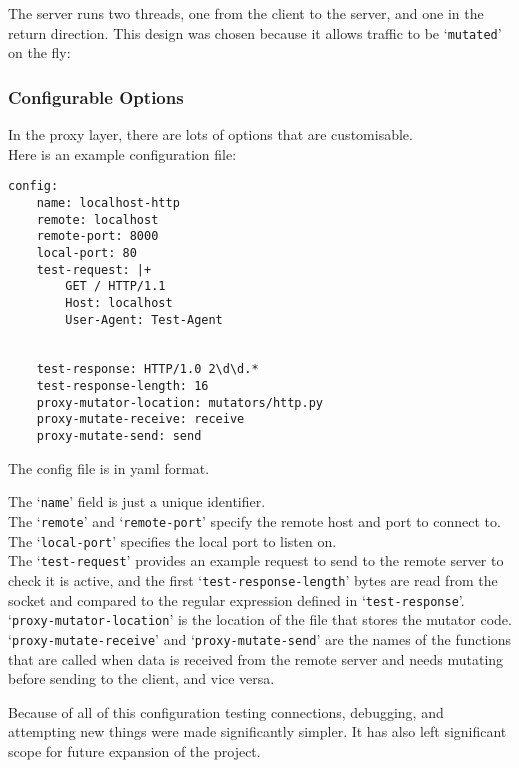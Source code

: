 The server runs two threads, one from the client to the server, and one in the return direction.\newpage
This design was chosen because it allows traffic to be `\texttt{mutated}' on the fly:
\begin{center}
\end{center}

\subsubsection{Configurable Options}
In the proxy layer, there are lots of options that are customisable.\\
Here is an example configuration file:
\begin{verbatim}
config:
    name: localhost-http
    remote: localhost
    remote-port: 8000
    local-port: 80
    test-request: |+
        GET / HTTP/1.1
        Host: localhost
        User-Agent: Test-Agent


    test-response: HTTP/1.0 2\d\d.*
    test-response-length: 16
    proxy-mutator-location: mutators/http.py
    proxy-mutate-receive: receive
    proxy-mutate-send: send
\end{verbatim}
The config file is in yaml format.\par
The `\texttt{name}' field is just a unique identifier.\\
The `\texttt{remote}' and `\texttt{remote-port}' specify the remote host and port to connect to.\\
The `\texttt{local-port}' specifies the local port to listen on.\\
The `\texttt{test-request}' provides an example request to send to the remote server to check it is active, and the first `\texttt{test-response-length}' bytes are read from the socket and compared to the regular expression defined in `\texttt{test-response}'.\\
`\texttt{proxy-mutator-location}' is the location of the file that stores the mutator code.
`\texttt{proxy-mutate-receive}' and `\texttt{proxy-mutate-send}' are the names of the functions that are called when data is received from the remote server and needs mutating before sending to the client, and vice versa.\par
Because of all of this configuration testing connections, debugging, and attempting new things were made significantly simpler. It has also left significant scope for future expansion of the project.

